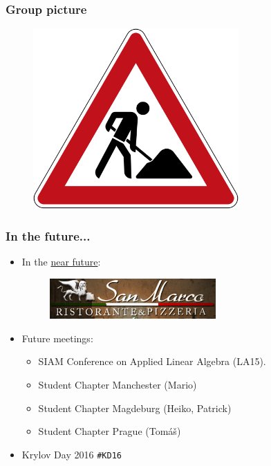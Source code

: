 \documentclass{beamer}
\begin{document}
\begin{frame}
 \frametitle{Group picture}
   \begin{figure}[t]
   \vspace{-0.3cm}
  \includegraphics[width=0.7\textwidth]{pics/baustelle.png}
  \end{figure}
\end{frame}

\begin{frame}
 \frametitle{In the future...}
 \begin{itemize}
  \item In the \href{http://www.sanmarco.nl/}{near future}:
    \begin{figure}[t]
  \includegraphics[width=0.6\textwidth]{pics/sanmarco_logo.png}
  \end{figure}
  \pause
  \vspace{0.3cm}
  \item Future meetings:
  \begin{itemize}
  \item SIAM Conference on Applied Linear Algebra (LA15).
  \item Student Chapter Manchester (Mario)
  \item Student Chapter Magdeburg (Heiko, Patrick)
  \item Student Chapter Prague (Tom{\'a}{\v s})
  \end{itemize}
  \pause
  \item {\color{red}Krylov Day 2016} \texttt{\#KD16}
 \end{itemize}

\end{frame}
\end{document}
